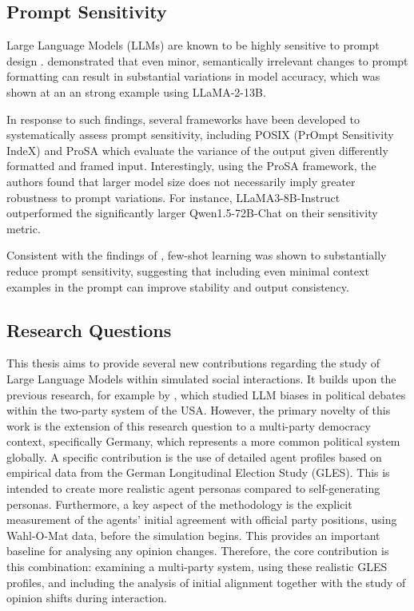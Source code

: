 \documentclass[12pt]{article}
\begin{document}
\begin{multicols}{2}
\subsection{Prompt Sensitivity}

Large Language Models (LLMs) are known to be highly sensitive to prompt design \cite{sclar2023quantifying, gao2020making, jiang2020can}.  demonstrated that even minor, semantically irrelevant changes to prompt formatting can result in substantial variations in model accuracy, which was shown at an an strong example using LLaMA-2-13B. 

In response to such findings, several frameworks have been developed to systematically assess prompt sensitivity, including POSIX (PrOmpt Sensitivity IndeX) \cite{chatterjee2024posix} and ProSA \cite{zhuo2024prosa} which evaluate the variance of the output given differently formatted and framed input. Interestingly, using the ProSA framework, the authors found that larger model size does not necessarily imply greater robustness to prompt variations. For instance, LLaMA3-8B-Instruct outperformed the significantly larger Qwen1.5-72B-Chat on their sensitivity metric.

Consistent with the findings of , few-shot learning was shown to substantially reduce prompt sensitivity, suggesting that including even minimal context examples in the prompt can improve stability and output consistency.

\subsection{Research Questions}

This thesis aims to provide several new contributions regarding the study of Large Language Models within simulated social interactions. It builds upon the previous research, for example by , which studied LLM biases in political debates within the two-party system of the USA. However, the primary novelty of this work is the extension of this research question to a multi-party democracy context, specifically Germany, which represents a more common political system globally. A specific contribution is the use of detailed agent profiles based on empirical data from the German Longitudinal Election Study (GLES). This is intended to create more realistic agent personas compared to self-generating personas. Furthermore, a key aspect of the methodology is the explicit measurement of the agents' initial agreement with official party positions, using Wahl-O-Mat data, before the simulation begins. This provides an important baseline for analysing any opinion changes. Therefore, the core contribution is this combination: examining a multi-party system, using these realistic GLES profiles, and including the analysis of initial alignment together with the study of opinion shifts during interaction.


\end{multicols}
\end{document}
